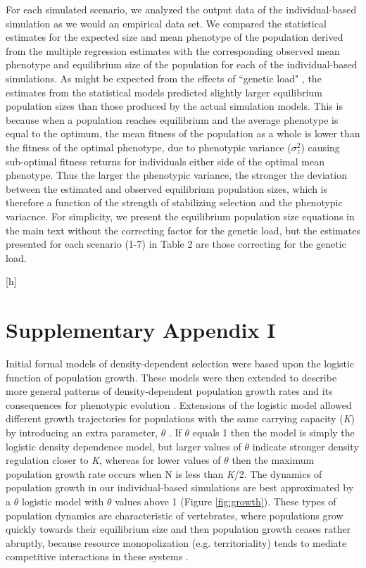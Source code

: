 \documentclass{article}
\begin{document}
 For each simulated scenario, we analyzed the output data of the individual-based simulation as we would an empirical data set. We compared the statistical estimates for the expected size and mean phenotype of the population derived from the multiple regression estimates with the corresponding observed mean phenotype and equilibrium size of the population for each of the individual-based simulations. As might be expected from the effects of 
“genetic load" \citep{Lande1996}, the estimates from the statistical models predicted slightly larger equilibrium population sizes than those produced by the actual simulation models. This is because when a population reaches equilibrium and the average phenotype is equal to the optimum, the mean fitness of the population as a whole is lower than the fitness of the optimal phenotype, due to phenotypic variance ($\sigma^2_z$) causing sub-optimal fitness returns for individuals either side of the optimal mean phenotype. Thus the larger the phenotypic variance, the stronger the deviation between the estimated and observed equilibrium population sizes, which is therefore a function of the strength of stabilizing selection and the phenotypic variacnce. For simplicity, we present the equilibrium population size equations in the main text without the correcting factor for the genetic load, but the estimates presented for each scenario (1-7) in Table 2 are those correcting for the genetic load.  

 \label{Table 2} [h]


\section{Supplementary Appendix I}
 Initial formal models of density-dependent selection \citep{Anderson1971, Charlesworth1971} were based upon the logistic function of population growth. These models were then extended to describe more general patterns of density-dependent population growth rates \citep{Gilpin1973a} and its consequences for phenotypic evolution \citep{Gilpin1976}. Extensions of the logistic model allowed different growth trajectories for populations with the same carrying capacity (\textit{K}) by introducing an extra parameter, $\theta$ \citep{Lande2003}. If $\theta$ equals 1 then the model is simply the logistic density dependence model, but larger values of $\theta$ indicate stronger density regulation closer to \textit{K}, whereas for lower values of $\theta$ then the maximum population growth rate occurs when N is less than \textit{K}/2. The dynamics of population growth in our individual-based simulations are best approximated by a $\theta$ logistic model with $\theta$ values above 1 (Figure \ref{fig:growth}). These types of population dynamics are characteristic of vertebrates, where populations grow quickly towards their equilibrium size and then population growth ceases rather abruptly, because resource monopolization (e.g. territoriality) tends to mediate competitive interactions in these systems \citep{Gilpin1973a}. 
 
\end{document}
